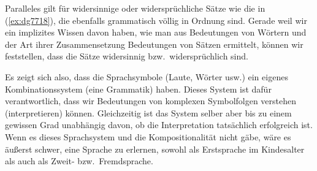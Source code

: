 Paralleles gilt für widersinnige oder widersprüchliche Sätze wie die in (\ref{ex:dg7718}), die ebenfalls grammatisch völlig in Ordnung sind.
Gerade weil wir ein implizites Wissen davon haben, wie man aus Bedeutungen von Wörtern und der Art ihrer Zusammensetzung Bedeutungen von Sätzen ermittelt, können wir feststellen, dass die Sätze widersinnig bzw.\ widersprüchlich sind.

\begin{exe}
  \ex\label{ex:dg7718}
  \begin{xlist}
  \end{xlist}
\end{exe}

Es zeigt sich also, dass die Sprachsymbole (Laute, Wörter usw.) ein eigenes Kombinationssystem (eine Grammatik) haben.
Dieses System ist dafür verantwortlich, dass wir Bedeutungen von komplexen Symbolfolgen verstehen (interpretieren) können.
Gleichzeitig ist das System selber aber bis zu einem gewissen Grad unabhängig davon, ob die Interpretation tatsächlich erfolgreich ist.
Wenn es dieses Sprachsystem und die Kompositionalität nicht gäbe, wäre es äußerst schwer, eine Sprache zu erlernen, sowohl als Erstsprache im Kindesalter als auch als Zweit- bzw.\ Fremdsprache.

